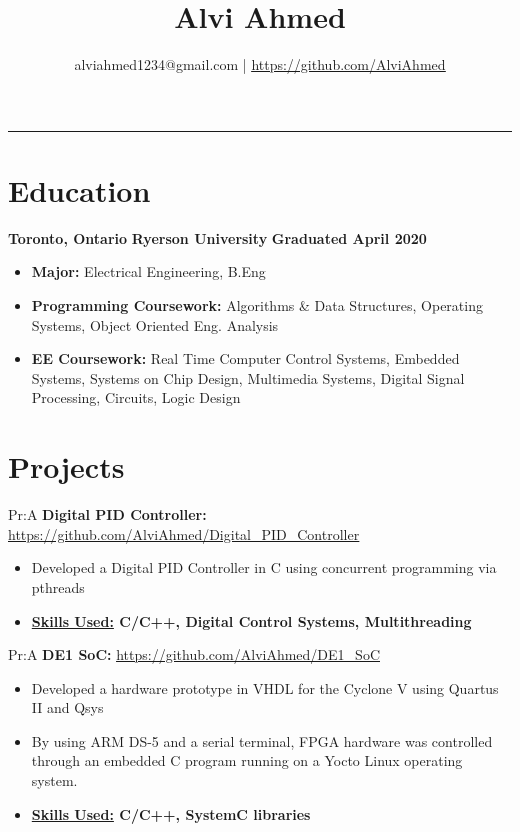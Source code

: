 \documentclass[11pt]{article}
\title{
	Alvi Ahmed
}
\author{alviahmed1234@gmail.com | \underline{\url{https://github.com/AlviAhmed}}}
\newcommand{\spaces}{1em}
\newcommand{\uniname}{Ryerson University}
\newcommand{\unigrad}{Graduated April 2020}
\newcommand{\uniloc}{Toronto, Ontario}
\newcommand{\uni}[3]{
  \begin{flushleft}
    {\small\bfseries #1}
    \hfill
    {\small\bfseries #2}
    \hfill
    {\small\bfseries #3}
\end{flushleft}
  \vspace{-0.7em}
}
\renewcommand{\maketitle}{
    \begin{center}
    \phantom{.} %
    \vspace{-2em}
    	{\Huge\bfseries \thetitle}
    	\vspace{-0.5em}
		\par\noindent\rule{\textwidth}{2pt}
	\end{center} 
	\begin{center} 
		\vspace{-1em}  
		{\small\theauthor}
	\end{center}
}
\begin{document}

\maketitle    

\section*{Education}
	\uni{\uniloc}{\uniname}{\unigrad}
	\begin{itemize}[noitemsep,nolistsep]   
		\item \textbf{Major:} Electrical Engineering, B.Eng
        \item \textbf{Programming Coursework: } Algorithms \& Data Structures,
           Operating Systems, Object Oriented Eng. Analysis 
        \item \textbf{EE Coursework: } Real Time Computer Control Systems,
          Embedded Systems, Systems on Chip Design, Multimedia Systems,
          Digital Signal Processing, Circuits, Logic Design
        \end{itemize}
        \section*{Projects}



Pr:A
\vspace{\spaces}
\textbf{Digital PID Controller: } \underline{\url{https://github.com/AlviAhmed/Digital_PID_Controller}}
\begin{itemize}[noitemsep,nolistsep]
\item Developed a Digital PID Controller in C using concurrent programming via pthreads
\item \textbf{ \underline{Skills Used:} C/C++, Digital Control Systems, Multithreading}
\end{itemize}


Pr:A
\textbf{DE1 SoC: } \underline{\url{https://github.com/AlviAhmed/DE1_SoC}}
\begin{itemize}[noitemsep,nolistsep]
\item Developed a hardware prototype in VHDL for the Cyclone V using Quartus II and Qsys
\item By using ARM DS-5 and a serial terminal, FPGA hardware was controlled through an embedded C program running on a Yocto Linux operating system.
\item \textbf{\underline{Skills Used:} C/C++, SystemC libraries}
\end{itemize}
\end{document}
